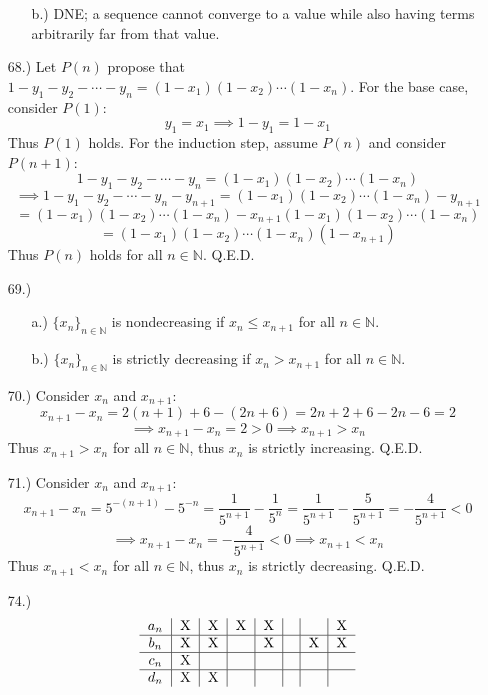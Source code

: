 \documentclass[12pt]{article}
\begin{document}
\begin{itemize}
\begin{itemize}
        \item [b.)] DNE; a sequence cannot converge to a value while also having terms arbitrarily far from that value.
    \end{itemize}

    \item [68.)] Let $P(n)$ propose that $1-y_1-y_2-\cdots-y_n=(1-x_1)(1-x_2)\cdots(1-x_n)$. For the base case, consider $P(1)$:
    \[y_1=x_1\implies1-y_1=1-x_1\]
    Thus $P(1)$ holds. For the induction step, assume $P(n)$ and consider $P(n+1)$:
    \[1-y_1-y_2-\cdots-y_n=(1-x_1)(1-x_2)\cdots(1-x_n)\]
    \[\implies1-y_1-y_2-\cdots-y_n-y_{n+1}=(1-x_1)(1-x_2)\cdots(1-x_n)-y_{n+1}\]
    \[=(1-x_1)(1-x_2)\cdots(1-x_n)-x_{n+1}(1-x_1)(1-x_2)\cdots(1-x_n)\]
    \[=(1-x_1)(1-x_2)\cdots(1-x_n)(1-x_{n+1})\]
    Thus $P(n)$ holds for all $n\in\mathbb{N}$. Q.E.D.

    \item [69.)] \begin{itemize}
        \item [a.)] $\{x_n\}_{n\in\mathbb{N}}$ is nondecreasing if $x_n\leq x_{n+1}$ for all $n\in\mathbb{N}$.

        \item [b.)] $\{x_n\}_{n\in\mathbb{N}}$ is strictly decreasing if $x_n>x_{n+1}$ for all $n\in\mathbb{N}$.
    \end{itemize}

    \item [70.)] Consider $x_n$ and $x_{n+1}$:
    \[x_{n+1}-x_n=2(n+1)+6-(2n+6)=2n+2+6-2n-6=2\]
    \[\implies x_{n+1}-x_n=2>0\implies x_{n+1}>x_n\]
    Thus $x_{n+1}>x_n$ for all $n\in\mathbb{N}$, thus $x_n$ is strictly increasing. Q.E.D.

    \item [71.)] Consider $x_n$ and $x_{n+1}$:
    \[x_{n+1}-x_n=5^{-(n+1)}-5^{-n}=\frac{1}{5^{n+1}}-\frac{1}{5^n}=\frac{1}{5^{n+1}}-\frac{5}{5^{n+1}}=-\frac{4}{5^{n+1}}<0\]
    \[\implies x_{n+1}-x_n=-\frac{4}{5^{n+1}}<0\implies x_{n+1}<x_n\]
    Thus $x_{n+1}<x_n$ for all $n\in\mathbb{N}$, thus $x_n$ is strictly decreasing. Q.E.D.

    \item [74.)] 
    \[
    \begin{tabular}{c|c|c|c|c|c|c|c}
        $a_n$ & X & X & X & X & & & X \\
        \hline
        $b_n$ & X & X & & X & & X & X \\
        \hline
        $c_n$ & X & & & & & & \\
        \hline
        $d_n$ & X & X & & & & & \\
    \end{tabular}
    \]


\end{itemize}
\end{document}
